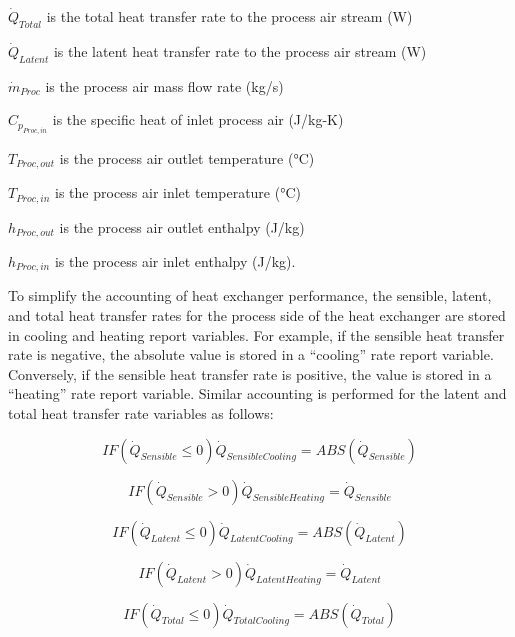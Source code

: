 \({\dot{Q}_{Total}}\) is the total heat transfer rate to the process air stream (W)

\({\dot{Q}_{Latent}}\) is the latent heat transfer rate to the process air stream (W)

\({\dot{m}_{Proc}}\) is the process air mass flow rate (kg/s)

\({C_{p_{Proc,in}}}\) is the specific heat of inlet process air (J/kg-K)

\({T_{Proc,out}}\) is the process air outlet temperature (°C)

\({T_{Proc,in}}\) is the process air inlet temperature (°C)

\({h_{Proc,out}}\) is the process air outlet enthalpy (J/kg)

\({h_{Proc,in}}\) is the process air inlet enthalpy (J/kg).

To simplify the accounting of heat exchanger performance, the sensible, latent, and total heat transfer rates for the process side of the heat exchanger are stored in cooling and heating report variables. For example, if the sensible heat transfer rate is negative, the absolute value is stored in a ``cooling'' rate report variable. Conversely, if the sensible heat transfer rate is positive, the value is stored in a ``heating'' rate report variable. Similar accounting is performed for the latent and total heat transfer rate variables as follows:

\begin{equation}
IF \left( {{{\dot{Q}_{Sensible}}} \leq 0} \right) {\dot{Q}_{SensibleCooling}} = ABS\left( {\dot{Q}_{Sensible}} \right)
\end{equation}

\begin{equation}
IF \left( {{\dot{Q}_{Sensible}} > 0} \right){\dot{Q}_{SensibleHeating}} = {\dot{Q}_{Sensible}}
\end{equation}

\begin{equation}
IF \left( {{{\dot{Q}_{Latent}}} \leq 0} \right) {\dot{Q}_{LatentCooling}} = ABS\left( {\dot{Q}_{Latent}} \right)
\end{equation}

\begin{equation}
IF \left( {{\dot{Q}_{Latent}} > 0} \right){\dot{Q}_{LatentHeating}} = {\dot{Q}_{Latent}}
\end{equation}

\begin{equation}
IF \left( {{{\dot{Q}_{Total}}} \leq 0} \right) {\dot{Q}_{TotalCooling}} = ABS\left( {\dot{Q}_{Total}} \right)
\end{equation}

